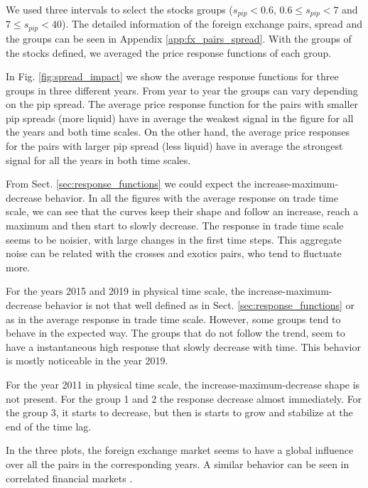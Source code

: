 We used three intervals to select the stocks groups ($s_{pip}<0.6$,
$0.6 \le s_{pip} <7$ and $7 \le s_{pip} <40$). The detailed information of the
foreign exchange pairs, spread and the groups can be seen in Appendix
\ref{app:fx_pairs_spread}. With the groups of the stocks defined, we averaged
the price response functions of each group.

In Fig. \ref{fig:spread_impact} we show the average response functions for
three groups in three different years. From year to year the groups can vary
depending on the pip spread. The average price response function for the pairs
with smaller pip spreads (more liquid) have in average the weakest signal in
the figure for all the years and both time scales. On the other hand, the
average price responses for the pairs with larger pip spread (less liquid) have
in average the strongest signal for all the years in both time scales.

From Sect. \ref{sec:response_functions} we could expect the
increase-maximum-decrease behavior. In all the figures with the average
response on trade time scale, we can see that the curves keep their shape and
follow an increase, reach a maximum and then start to slowly decrease. The
response in trade time scale seems to be noisier, with large changes in the
first time steps. This aggregate noise can be related with the crosses and
exotics pairs, who tend to fluctuate more.

For the years 2015 and 2019 in physical time scale, the
increase-maximum-decrease behavior is not that well defined as in Sect.
\ref{sec:response_functions} or as in the average response in trade time scale.
However, some groups tend to behave in the expected way. The groups that do not
follow the trend, seem to have a instantaneous high response that slowly
decrease with time. This behavior is mostly noticeable in the year 2019.

For the year 2011 in physical time scale, the increase-maximum-decrease shape
is not present. For the group 1 and 2 the response decrease almost immediately.
For the group 3, it starts to decrease, but then is starts to grow and
stabilize at the end of the time lag.

In the three plots, the foreign exchange market seems to have a global
influence over all the pairs in the corresponding years. A similar behavior
can be seen in correlated financial markets \cite{my_paper_response_financial}.